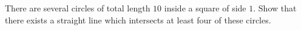There are several circles of total length $10$ inside a square of side $1$. Show that there exists a straight line which intersects at least four of these circles.
